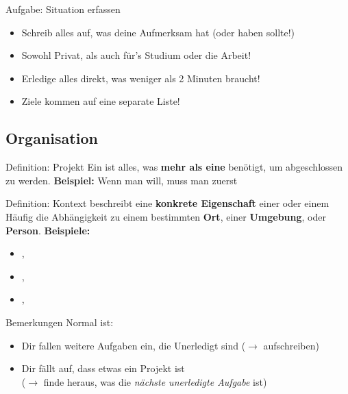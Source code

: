 \begin{frame}[c]
    \large
    \begin{block}{Aufgabe: Situation erfassen}
    \begin{itemize}[<+(1)->]
        \item Schreib alles auf, was deine Aufmerksam hat (oder haben sollte!)
        \item Sowohl Privat, als auch für's Studium oder die Arbeit!
        \item Erledige alles direkt, was weniger als 2 Minuten braucht!
        \item Ziele kommen auf eine separate Liste!
    \end{itemize}
    \end{block}
\end{frame}


\subsection{Organisation}

\begin{frame}[c]{Definition: Projekt}
    Ein  ist alles, was \textbf{mehr als eine}  benötigt, um abgeschlossen zu werden. \newline \newline \pause
    \textbf{Beispiel:} Wenn man 
    will, muss man zuerst 
\end{frame}


\begin{frame}[c]{Definition: Kontext}
     beschreibt eine \textbf{konkrete Eigenschaft} einer
     oder einem  Häufig die Abhängigkeit zu einem
    bestimmten \textbf{Ort}, einer \textbf{Umgebung}, oder \textbf{Person}.
    \newline \newline \pause
    \textbf{Beispiele:}
    \begin{itemize}[<+(1)->]
        \item {}, 
        \item {}, 
        \item {}, 
    \end{itemize}
\end{frame}


\begin{frame}[c]{Bemerkungen}
    \large
    Normal ist:
    \begin{itemize}[<+(1)->]
        \item Dir fallen weitere Aufgaben ein, die Unerledigt sind ($\rightarrow$ aufschreiben)
        \item Dir fällt auf, dass etwas ein Projekt ist \\ ($\rightarrow$ finde heraus, was die {\em nächste unerledigte Aufgabe} ist)
    \end{itemize}
\end{frame}



